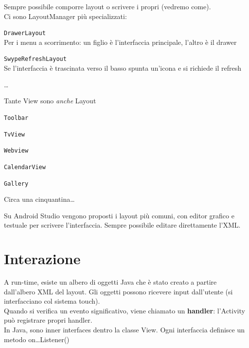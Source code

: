 \documentclass[10pt]{book}
\begin{document}
Sempre possibile comporre layout o scrivere i propri (vedremo come).\\
Ci sono LayoutManager più specializzati:
\begin{list}{}{}
	\item \texttt{DrawerLayout}\\
	Per i menu a scorrimento: un figlio è l'interfaccia principale, l'altro è il drawer
	\item \texttt{SwypeRefreshLayout}\\
	Se l'interfaccia è trascinata verso il basso spunta un'icona e si richiede il refresh
	\item \ldots
\end{list}
Tante View sono \textit{anche} Layout
\begin{list}{}{}
	\item \texttt{Toolbar}
	\item \texttt{TvView}
	\item \texttt{Webview}
	\item \texttt{CalendarView}
	\item \texttt{Gallery}
	\item Circa una cinquantina\ldots
\end{list}
Su Android Studio vengono proposti i layout più comuni, con editor grafico e testuale per scrivere l'interfaccia. Sempre possibile editare direttamente l'XML.
\section{Interazione}
A run-time, esiste un albero di oggetti Java che è stato creato a partire dall'albero XML del layout. Gli oggetti possono ricevere input dall'utente (si interfacciano col sistema touch).\\
Quando si verifica un evento significativo, viene chiamato un \textbf{handler}: l'Activity può registrare propri handler.\\
In Java, sono inner interfaces dentro la classe View. Ogni interfaccia definisce un metodo on\ldots Listener()
\end{document}
